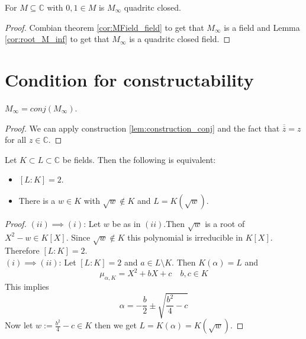 \begin{lemma}
    \label{lem:M_inf_quad_closed}
    For $M\subseteq \mathbb{C}$ with $0,1 \in M$ is $M_{\infty}$ quadritc closed.
\end{lemma}
\begin{proof}
    Combian theorem \ref{cor:MField_field} to get that $M_{\infty}$ is a field and Lemma \ref{cor:root_M_inf} to get that $M_{\infty}$ is a quadritc closed field.
\end{proof}

\section{Condition for constructability}

\begin{lemma}
    $M_{\infty} = conj(M_{\infty})$.
\end{lemma}
\begin{proof}
    We can apply construction \ref{lem:construction_conj} and the fact that $\overline{\overline z} = z$ for all $z \in\mathbb{C}$.
\end{proof}

\begin{lemma}
    \label{lem:dergee2_iff_adjoint_sqrt}
    Let $K\subset L \subset \mathbb{C}$ be fields. Then the following is equivalent:
    \begin{itemize}
        \item $[L:K] = 2$.
        \item There is a $w \in K$ with $\sqrt{w} \notin K$ and $L = K(\sqrt{w})$.
    \end{itemize}
\end{lemma}
\begin{proof}
    $(ii)\implies (i)$: Let $w$ be as in $(ii)$.Then $\sqrt{w}$ is a root of $X^2 - w \in K[X]$. Since $\sqrt{w} \notin K$ this polynomial is irreducible in $K[X]$. Therefore $[L:K] = 2$.\\
    $(i)\implies (ii)$: Let $[L:K] = 2$ and $a \in L \setminus K$. Then $K(\alpha) = L$ and 
    $$\mu_{\alpha, K}=X^2 + bX + c \quad b,c \in K$$
    This implies 
    $$\alpha = -\frac{b}{2} \pm \sqrt{\frac{b^2}{4} - c} $$
    Now let $w := \frac{b^2}{4} - c \in K$ then we get $L = K(\alpha) = K(\sqrt{w})$.
\end{proof}

